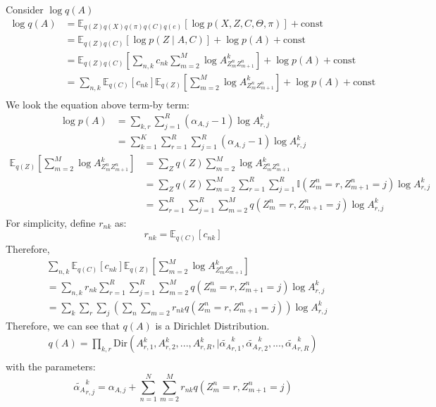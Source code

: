 \documentclass[12pt]{article}
\newenvironment{problem}[2][Problem]{\begin{trivlist}
\item[\hskip \labelsep {\bfseries #1}\hskip \labelsep {\bfseries #2.}]}{\end{trivlist}}
\begin{document}
\begin{problem}{2.8.24}
\medskip
Consider $\log q(A)$
\begin{align*}
    \log q(A) &= \mathbb{E}_{q(Z)q(X)q(\pi)q(C)q(e)}[\log p(X, Z, C, \Theta, \pi)] + \text{const} \\
    &= \mathbb{E}_{q(Z)q(C)}[\log p(Z\mid A, C)] + \log p(A)+ \text{const} \\
    &= \mathbb{E}_{q(Z)q(C)}[\sum_{n,k}c_{nk}\sum_{m=2}^{M}\log A^k_{Z^n_{m}Z^n_{m+1}}] 
        + \log p(A)+ \text{const} \\
    &= \sum_{n,k}\mathbb{E}_{q(C)}[c_{nk}]\mathbb{E}_{q(Z)}[\sum_{m=2}^{M}\log A^k_{Z^n_{m}Z^n_{m+1}}] 
        + \log p(A)+ \text{const} \\
\end{align*}
We look the equation above term-by term:
\begin{align*}
    \log p(A) &= \sum_{k,r}\sum_{j=1}^{R} (\alpha_{A,j} - 1)\log A^k_{r,j} \\
    &= \sum_{k=1}^{K}\sum_{r=1}^{R}\sum_{j=1}^{R} (\alpha_{A,j} - 1)\log A^k_{r,j}
\end{align*}
\begin{align*}
    \mathbb{E}_{q(Z)}[\sum_{m=2}^{M}\log A^k_{Z^n_{m}Z^n_{m+1}}] &=
    \sum_{Z}q(Z)\sum_{m=2}^{M}\log A^k_{Z^n_{m}Z^n_{m+1}} \\
    &= \sum_{Z}q(Z)\sum_{m=2}^{M}\sum_{r=1}^{R}\sum_{j=1}^{R}\mathbb{I}(Z^n_{m}=r, Z^n_{m+1}=j)\log A^k_{r,j} \\
    &= \sum_{r=1}^{R}\sum_{j=1}^{R}\sum_{m=2}^{M}q(Z^n_{m}=r, Z^n_{m+1}=j)\log A^k_{r,j}
\end{align*}
For simplicity, define $r_{nk}$ as:
\begin{equation}
    r_{nk} = \mathbb{E}_{q(C)}[c_{nk}] 
\end{equation}
Therefore,
\begin{align*}
    &\sum_{n,k}\mathbb{E}_{q(C)}[c_{nk}]\mathbb{E}_{q(Z)}[\sum_{m=2}^{M}\log A^k_{Z^n_{m}Z^n_{m+1}}] \\
    &= \sum_{n,k} r_{nk} \sum_{r=1}^{R}\sum_{j=1}^{R}\sum_{m=2}^{M}q(Z^n_{m}=r, Z^n_{m+1}=j)\log A^k_{r,j} \\
    &= \sum_{k}\sum_{r}\sum_{j}(\sum_{n}\sum_{m=2}r_{nk} q(Z^n_{m}=r, Z^n_{m+1}=j))\log A^k_{r,j}
\end{align*}
Therefore, we can see that $q(A)$ is a Dirichlet Distribution.
\begin{align*}
    q(A) = \prod_{k,r} \mathrm{Dir}(A^k_{r,1}, A^k_{r,2}, ..., A^k_{r,R},
        \mid \tilde{\alpha_{A}}^k_{r,1},\tilde{\alpha_{A}}^k_{r,2},...,\tilde{\alpha_{A}}^k_{r,R}) \\
\end{align*}
with the parameters:
\begin{equation}
    \tilde{\alpha_{A}}^k_{r,j} = \alpha_{A,j} + \sum_{n=1}^{N}\sum_{m=2}^{M}r_{nk} q(Z^n_{m}=r, Z^n_{m+1}=j)
\end{equation}
\end{problem}
\end{document}
